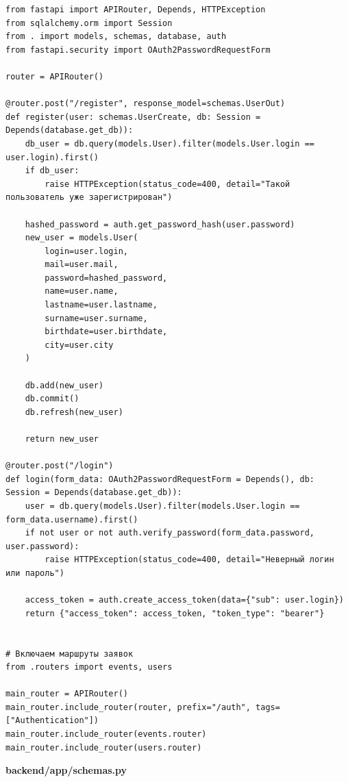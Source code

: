 \documentclass[coursework]{SCWorks}
\begin{document}
\begin{verbatim}
from fastapi import APIRouter, Depends, HTTPException
from sqlalchemy.orm import Session
from . import models, schemas, database, auth
from fastapi.security import OAuth2PasswordRequestForm

router = APIRouter()

@router.post("/register", response_model=schemas.UserOut)
def register(user: schemas.UserCreate, db: Session = Depends(database.get_db)):
    db_user = db.query(models.User).filter(models.User.login == user.login).first()
    if db_user:
        raise HTTPException(status_code=400, detail="Такой пользователь уже зарегистрирован")
    
    hashed_password = auth.get_password_hash(user.password)
    new_user = models.User(
        login=user.login, 
        mail=user.mail, 
        password=hashed_password, 
        name=user.name, 
        lastname=user.lastname, 
        surname=user.surname, 
        birthdate=user.birthdate, 
        city=user.city
    )
    
    db.add(new_user)
    db.commit()
    db.refresh(new_user)
    
    return new_user

@router.post("/login")
def login(form_data: OAuth2PasswordRequestForm = Depends(), db: Session = Depends(database.get_db)):
    user = db.query(models.User).filter(models.User.login == form_data.username).first()
    if not user or not auth.verify_password(form_data.password, user.password):
        raise HTTPException(status_code=400, detail="Неверный логин или пароль")
    
    access_token = auth.create_access_token(data={"sub": user.login})
    return {"access_token": access_token, "token_type": "bearer"}


# Включаем маршруты заявок
from .routers import events, users

main_router = APIRouter()
main_router.include_router(router, prefix="/auth", tags=["Authentication"])
main_router.include_router(events.router)
main_router.include_router(users.router)

\end{verbatim}

\begin{center}
\textbf{backend/app/schemas.py}
\end{center}
\end{document}

